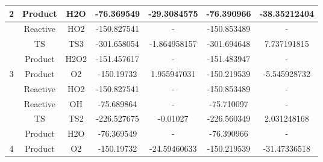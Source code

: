 \begin{tabular}{|c|c|c|c|c|c|c|}
    \multirow{-5}{*}{2}                  & Product                              & H2O                                    & -76.369549                        & -29.3084575                        & -76.390966                        & -38.35212404                       \\ \hline
                                         & Reactive                             & HO2                                    & -150.827541                       & -                                  & -150.853489                       & -                                  \\ \cline{2-7} 
                                         & TS                                   & TS3                                    & -301.658054                       & -1.864958157                       & -301.694648                       & 7.737191815                        \\ \cline{2-7} 
                                         & Product                              & H2O2                                   & -151.457617                       & -                                  & -151.483947                       & -                                  \\ \cline{2-7} 
    \multirow{-4}{*}{3}                  & Product                              & O2                                     & -150.19732                        & 1.955947031                        & -150.219539                       & -5.545928732                       \\ \hline
                                         & Reactive                             & HO2                                    & -150.827541                       & -                                  & -150.853489                       & -                                  \\ \cline{2-7} 
                                         & Reactive                             & OH                                     & -75.689864                        & -                                  & -75.710097                        & -                                  \\ \cline{2-7} 
                                         & TS                                   & TS2                                    & -226.527675                       & -0.01027                           & -226.560349                       & 2.031248168                        \\ \cline{2-7} 
                                         & Product                              & H2O                                    & -76.369549                        & -                                  & -76.390966                        & -                                  \\ \cline{2-7} 
    \multirow{-5}{*}{4}                  & Product                              & O2                                     & -150.19732                        & -24.59460633                       & -150.219539                       & -31.47336518                       \\ \hline
\end{tabular}
